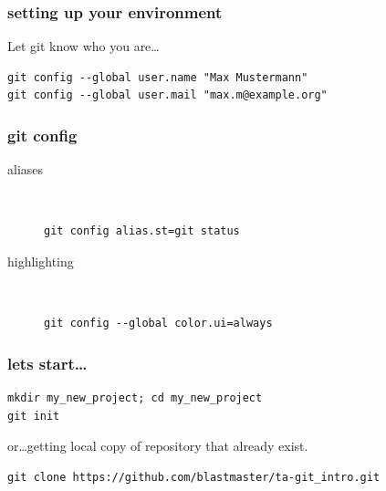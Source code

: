 
\begin{frame}[fragile]
    \frametitle{setting up your environment}
    Let git know who you are\ldots
    \begin{lstlisting}
git config --global user.name "Max Mustermann"
git config --global user.mail "max.m@example.org"
    \end{lstlisting}
\end{frame}

\begin{frame}[fragile]
    \frametitle{git config}
    \begin{description}
        \item[aliases] \hfill \\
            \begin{lstlisting}
git config alias.st=git status
            \end{lstlisting}
        \item[highlighting] \hfill \\
            \begin{lstlisting}
git config --global color.ui=always
            \end{lstlisting}
    \end{description}
\end{frame}

\begin{frame}[fragile]
    \frametitle{lets start\ldots}
    \begin{lstlisting}
mkdir my_new_project; cd my_new_project
git init
    \end{lstlisting}
    or\ldots getting local copy of repository that already exist.\\
    \begin{lstlisting}
git clone https://github.com/blastmaster/ta-git_intro.git
    \end{lstlisting}
\end{frame}

